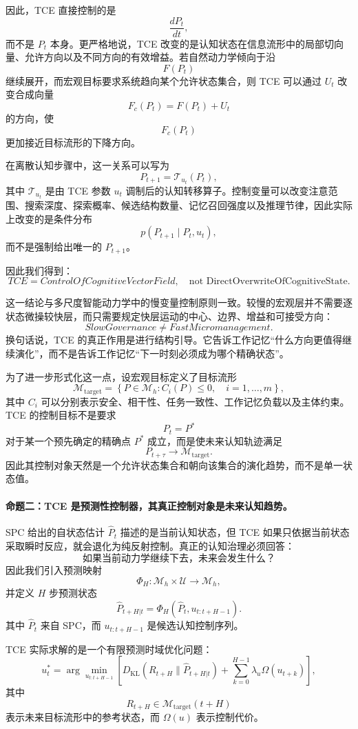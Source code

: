 因此，TCE 直接控制的是
\[
\frac{dP_t}{dt},
\]
而不是 $P_t$ 本身。更严格地说，TCE 改变的是认知状态在信息流形中的局部切向量、允许方向以及不同方向的有效增益。若自然动力学倾向于沿
\[
F(P_t)
\]
继续展开，而宏观目标要求系统趋向某个允许状态集合，则 TCE 可以通过 $U_t$ 改变合成向量
\[
F_c(P_t)
=
F(P_t)+U_t
\]
的方向，使
\[
F_c(P_t)
\]
更加接近目标流形的下降方向。

在离散认知步骤中，这一关系可以写为
\[
P_{t+1}
=
\mathcal{T}_{u_t}(P_t),
\]
其中 $\mathcal{T}_{u_t}$ 是由 TCE 参数 $u_t$ 调制后的认知转移算子。控制变量可以改变注意范围、搜索深度、探索概率、候选结构数量、记忆召回强度以及推理节律，因此实际上改变的是条件分布
\[
p(P_{t+1}\mid P_t,u_t),
\]
而不是强制给出唯一的 $P_{t+1}$。

因此我们得到：
\[
\boxed{
TCE
=
ControlOfCognitiveVectorField,
\quad
\text{not DirectOverwriteOfCognitiveState}.
}
\]

这一结论与多尺度智能动力学中的慢变量控制原则一致。较慢的宏观层并不需要逐状态微操较快层，而只需要规定快层运动的中心、边界、增益和可接受方向：
\[
SlowGovernance
\neq
FastMicromanagement.
\]
换句话说，TCE 的真正作用是进行结构引导。它告诉工作记忆``什么方向更值得继续演化''，而不是告诉工作记忆``下一时刻必须成为哪个精确状态''。

为了进一步形式化这一点，设宏观目标定义了目标流形
\[
\mathcal{M}_{\mathrm{target}}
=
\left\{
P\in\mathcal{M}_{h}
:
C_i(P)\le 0,
\quad
i=1,\ldots,m
\right\},
\]
其中 $C_i$ 可以分别表示安全、相干性、任务一致性、工作记忆负载以及主体约束。TCE 的控制目标不是要求
\[
P_t=P^{*}
\]
对于某一个预先确定的精确点 $P^{*}$ 成立，而是使未来认知轨迹满足
\[
P_{t+\tau}
\rightarrow
\mathcal{M}_{\mathrm{target}}.
\]
因此其控制对象天然是一个允许状态集合和朝向该集合的演化趋势，而不是单一状态值。

\paragraph{命题二：TCE 是预测性控制器，其真正控制对象是未来认知趋势。}

SPC 给出的自状态估计 $\hat P_t$ 描述的是当前认知状态，但 TCE 如果只依据当前状态采取瞬时反应，就会退化为纯反射控制。真正的认知治理必须回答：
\[
\text{如果当前动力学继续下去，未来会发生什么？}
\]
因此我们引入预测映射
\[
\Phi_H:
\mathcal{M}_{h}\times\mathcal{U}
\rightarrow
\mathcal{M}_{h},
\]
并定义 $H$ 步预测状态
\[
\widehat P_{t+H|t}
=
\Phi_H
\left(
\hat P_t,
u_{t:t+H-1}
\right).
\]
其中 $\hat P_t$ 来自 SPC，而 $u_{t:t+H-1}$ 是候选认知控制序列。

TCE 实际求解的是一个有限预测时域优化问题：
\[
u_t^{*}
=
\arg\min_{u_{t:t+H-1}}
\left[
D_{\mathrm{KL}}
\left(
R_{t+H}
\|
\widehat P_{t+H|t}
\right)
+
\sum_{k=0}^{H-1}
\lambda_u
\Omega(u_{t+k})
\right],
\label{eq:predictive-information-geometric-control}
\]
其中
\[
R_{t+H}
\in
\mathcal{M}_{\mathrm{target}}(t+H)
\]
表示未来目标流形中的参考状态，而 $\Omega(u)$ 表示控制代价。

